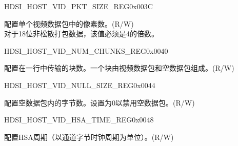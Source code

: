     
    \begin{register}{H}{DSI\_HOST\_VID\_PKT\_SIZE\_REG}{0x003C}\label{regdesc:DSIHOSTVIDPKTSIZEREG}
    \regnewline%
    \begin{regdesc}\begin{reglist}
    \label{fielddesc:DSIHOSTVIDPKTSIZE}\item [DSI\_HOST\_VID\_PKT\_SIZE] 配置单个视频数据包中的像素数。(R/W)\\
    对于18位非松散打包数据，该值必须是4的倍数。
    \end{reglist}\end{regdesc}
    \end{register}
    
    
    \begin{register}{H}{DSI\_HOST\_VID\_NUM\_CHUNKS\_REG}{0x0040}\label{regdesc:DSIHOSTVIDNUMCHUNKSREG}
    \regnewline%
    \begin{regdesc}\begin{reglist}
    \label{fielddesc:DSIHOSTVIDNUMCHUNKS}\item [DSI\_HOST\_VID\_NUM\_CHUNKS] 配置在一行中传输的块数。一个块由视频数据包和空数据包组成。(R/W)
    \end{reglist}\end{regdesc}
    \end{register}
    
    
    \begin{register}{H}{DSI\_HOST\_VID\_NULL\_SIZE\_REG}{0x0044}\label{regdesc:DSIHOSTVIDNULLSIZEREG}
    \regnewline%
    \begin{regdesc}\begin{reglist}
    \label{fielddesc:DSIHOSTVIDNULLSIZE}\item [DSI\_HOST\_VID\_NULL\_SIZE] 配置空数据包内的字节数。设置为0以禁用空数据包。(R/W)
    \end{reglist}\end{regdesc}
    \end{register}
    
    
    \begin{register}{H}{DSI\_HOST\_VID\_HSA\_TIME\_REG}{0x0048}\label{regdesc:DSIHOSTVIDHSATIMEREG}
    \regnewline%
    \begin{regdesc}\begin{reglist}
    \label{fielddesc:DSIHOSTVIDHSATIME}\item [DSI\_HOST\_VID\_HSA\_TIME] 配置HSA周期（以通道字节时钟周期为单位）。(R/W)
    \end{reglist}\end{regdesc}
    \end{register}
    

